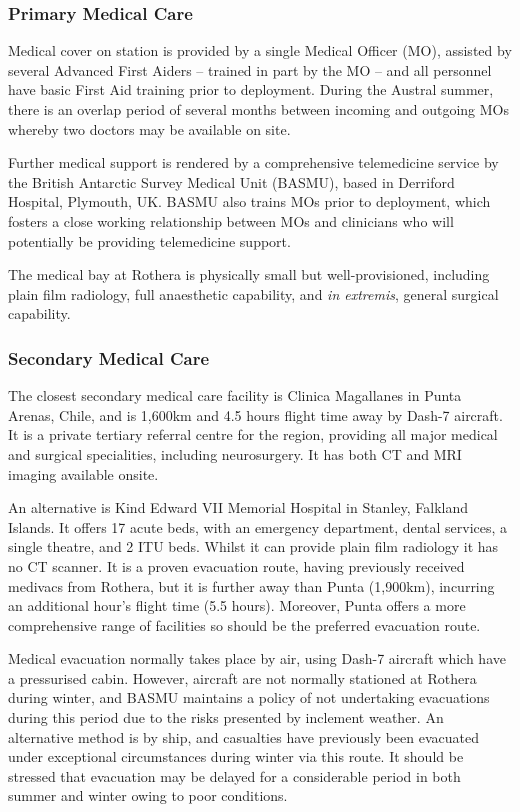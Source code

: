 \documentclass[12pt,a4paper]{article}
\begin{document}
\subsubsection{Primary Medical Care}

Medical cover on station is provided by a single Medical Officer (MO), assisted by several Advanced First Aiders -- trained in part by the MO -- and all personnel have basic First Aid training prior to deployment. During the Austral summer, there is an overlap period of several months between incoming and outgoing MOs whereby two doctors may be available on site.

Further medical support is rendered by a comprehensive telemedicine service by the British Antarctic Survey Medical Unit (BASMU), based in Derriford Hospital, Plymouth, UK. BASMU also trains MOs prior to deployment, which fosters a close working relationship between MOs and clinicians who will potentially be providing telemedicine support.

The medical bay at Rothera is physically small but well-provisioned, including plain film radiology, full anaesthetic capability, and \emph{in extremis}, general surgical capability.

\subsubsection{Secondary Medical Care}

The closest secondary medical care facility is Clinica Magallanes\cite{Anonymous:TgM8hVWD} in Punta Arenas, Chile, and is 1,600km and 4.5 hours flight time away by Dash-7 aircraft. It is a private tertiary referral centre for the region, providing all major medical and surgical specialities, including neurosurgery. It has both CT and MRI imaging available onsite.

An alternative is Kind Edward VII Memorial Hospital in Stanley, Falkland Islands. It offers 17 acute beds, with an emergency department, dental services, a single theatre, and 2 ITU beds.\cite{Anonymous:qFBtPcmx} Whilst it can provide plain film radiology it has no CT scanner. It is a proven evacuation route, having previously received medivacs from Rothera, but it is further away than Punta (1,900km), incurring an additional hour's flight time (5.5 hours). Moreover, Punta offers a more comprehensive range of facilities so should be the preferred evacuation route.

Medical evacuation normally takes place by air, using Dash-7 aircraft which have a pressurised cabin. However, aircraft are not normally stationed at Rothera during winter, and BASMU maintains a policy of not undertaking evacuations during this period due to the risks presented by inclement weather. An alternative method is by ship, and casualties have previously been evacuated under exceptional circumstances during winter via this route. It should be stressed that evacuation may be delayed for a considerable period in both summer and winter owing to poor conditions.
\end{document}
